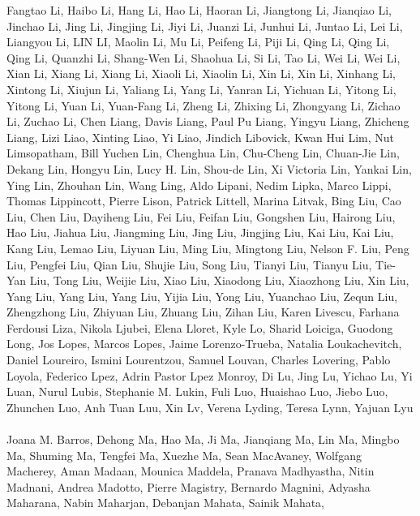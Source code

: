 \documentclass[11pt]{article}
\begin{document}
\begin{description}[itemsep=4mm, style=nextline]
Fangtao Li, 
Haibo Li, 
Hang Li, 
Hao Li, 
Haoran Li, 
Jiangtong Li, 
Jianqiao Li, 
Jinchao Li, 
Jing Li, 
Jingjing Li, 
Jiyi Li, 
Juanzi Li, 
Junhui Li, 
Juntao Li, 
Lei Li, 
Liangyou Li, 
LIN LI, 
Maolin Li, 
Mu Li, 
Peifeng Li, 
Piji Li, 
Qing Li, 
Qing Li, 
Qing Li, 
Quanzhi Li, 
Shang-Wen Li, 
Shaohua Li, 
Si Li, 
Tao Li, 
Wei Li, 
Wei Li, 
Xian Li, 
Xiang Li, 
Xiang Li, 
Xiaoli Li, 
Xiaolin Li, 
Xin Li, 
Xin Li, 
Xinhang Li, 
Xintong Li, 
Xiujun Li, 
Yaliang Li, 
Yang Li, 
Yanran Li, 
Yichuan Li, 
Yitong Li, 
Yitong Li, 
Yuan Li, 
Yuan-Fang Li, 
Zheng Li, 
Zhixing Li, 
Zhongyang Li, 
Zichao Li, 
Zuchao Li, 
Chen Liang, 
Davis Liang, 
Paul Pu Liang, 
Yingyu Liang, 
Zhicheng Liang, 
Lizi Liao, 
Xinting Liao, 
Yi Liao, 
Jindich Libovick, 
Kwan Hui Lim, 
Nut Limsopatham, 
Bill Yuchen Lin, 
Chenghua Lin, 
Chu-Cheng Lin, 
Chuan-Jie Lin, 
Dekang Lin, 
Hongyu Lin, 
Lucy H. Lin, 
Shou-de Lin, 
Xi Victoria Lin, 
Yankai Lin, 
Ying Lin, 
Zhouhan Lin, 
Wang Ling, 
Aldo Lipani, 
Nedim Lipka, 
Marco Lippi, 
Thomas Lippincott, 
Pierre Lison, 
Patrick Littell, 
Marina Litvak, 
Bing Liu, 
Cao Liu, 
Chen Liu, 
Dayiheng Liu, 
Fei Liu, 
Feifan Liu, 
Gongshen Liu, 
Hairong Liu, 
Hao Liu, 
Jiahua Liu, 
Jiangming Liu, 
Jing Liu, 
Jingjing Liu, 
Kai Liu, 
Kai Liu, 
Kang Liu, 
Lemao Liu, 
Liyuan Liu, 
Ming Liu, 
Mingtong Liu, 
Nelson F. Liu, 
Peng Liu, 
Pengfei Liu, 
Qian Liu, 
Shujie Liu, 
Song Liu, 
Tianyi Liu, 
Tianyu Liu, 
Tie-Yan Liu, 
Tong Liu, 
Weijie Liu, 
Xiao Liu, 
Xiaodong Liu, 
Xiaozhong Liu, 
Xin Liu, 
Yang Liu, 
Yang Liu, 
Yang Liu, 
Yijia Liu, 
Yong Liu, 
Yuanchao Liu, 
Zequn Liu, 
Zhengzhong Liu, 
Zhiyuan Liu, 
Zhuang Liu, 
Zihan Liu, 
Karen Livescu, 
Farhana Ferdousi Liza, 
Nikola Ljubei, 
Elena Lloret, 
Kyle Lo, 
Sharid Loiciga, 
Guodong Long, 
Jos Lopes, 
Marcos Lopes, 
Jaime Lorenzo-Trueba, 
Natalia Loukachevitch, 
Daniel Loureiro, 
Ismini Lourentzou, 
Samuel Louvan, 
Charles Lovering, 
Pablo Loyola, 
Federico Lpez, 
Adrin Pastor Lpez Monroy, 
Di Lu, 
Jing Lu, 
Yichao Lu, 
Yi Luan, 
Nurul Lubis, 
Stephanie M. Lukin, 
Fuli Luo, 
Huaishao Luo, 
Jiebo Luo, 
Zhunchen Luo, 
Anh Tuan Luu, 
Xin Lv, 
Verena Lyding, 
Teresa Lynn, 
Yajuan Lyu
\\
\\
Joana M. Barros, 
Dehong Ma, 
Hao Ma, 
Ji Ma, 
Jianqiang Ma, 
Lin Ma, 
Mingbo Ma, 
Shuming Ma, 
Tengfei Ma, 
Xuezhe Ma, 
Sean MacAvaney, 
Wolfgang Macherey, 
Aman Madaan, 
Mounica Maddela, 
Pranava Madhyastha, 
Nitin Madnani, 
Andrea Madotto, 
Pierre Magistry, 
Bernardo Magnini, 
Adyasha Maharana, 
Nabin Maharjan, 
Debanjan Mahata, 
Sainik Mahata, 

\end{description}
\end{document}
